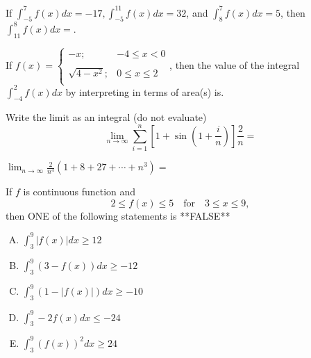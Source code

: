 \documentclass[
  course = {{MATH102 Calculus II}},
  quartile = {{2}},
  assignment = 2 - Wednesday,
  firstexercise = 1,
  term = 202
]{aga-homework}
\begin{document}
\newpage

\problem[3] If $\int_{-5}^7f(x)dx=-17, \int_{-5}^{11}f(x)dx=32$, and $\int_{8}^7f(x)dx=5$, then $\int_{11}^8f(x)dx=$.

\newpage

\problem[4] If ${\displaystyle f(x) = \left\{\begin{array}{ll}
         -x; & -4\leq x <0 \\
         \\
         \sqrt{4-x^2}; & 0\leq x \leq 2 \\
       \end{array}\right.}$, then the value of the integral
       $ \displaystyle
       \int_{-4}^{2} f(x) dx
       $
       by interpreting in terms of area(s) is.


\newpage
\problem[5] Write the limit as an integral (do not evaluate) \[\displaystyle \lim_{n\to \infty} \sum_{i=1}^{n}\left[1+\sin\left(1+\frac{i}{n}\right)\right]\frac{2}{n}=
\]

\newpage

\problem[6] $\displaystyle \lim_{n\to\infty} \frac{2}{n^4}(1+8+27+\cdots+n^3)=$
\newpage




\problem[7] If $f$ is continuous function and
 \[ 2\leq f(x) \leq 5 \quad \text{for} \quad 3\leq x \leq 9,\]
then ONE of the following statements is **FALSE**

\begin{enumerate}[(A)]
    \item $\int_{3}^{9}\left|f(x)\right|dx\geq 12$

    \item $\int_{3}^{9}\left(3-f(x)\right)dx\geq -12$

    \item $\int_{3}^{9}\left(1-\left|f(x)\right|\right)dx\geq -10$

    \item $\int_{3}^{9}-2f(x)dx\leq -24$

    \item $\int_{3}^{9}\left(f(x)\right)^2dx\geq 24$
\end{enumerate}
\end{document}
